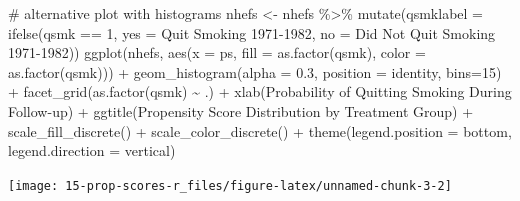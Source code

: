 \documentclass[
  10pt,
  a4paper,
]{book}
\newenvironment{Shaded}{\begin{snugshade}}{\end{snugshade}}
\newcommand{\AttributeTok}[1]{\textcolor[rgb]{0.40,0.45,0.13}{#1}}
\newcommand{\CommentTok}[1]{\textcolor[rgb]{0.37,0.37,0.37}{#1}}
\newcommand{\DecValTok}[1]{\textcolor[rgb]{0.68,0.00,0.00}{#1}}
\newcommand{\FloatTok}[1]{\textcolor[rgb]{0.68,0.00,0.00}{#1}}
\newcommand{\FunctionTok}[1]{\textcolor[rgb]{0.28,0.35,0.67}{#1}}
\newcommand{\NormalTok}[1]{\textcolor[rgb]{0.00,0.46,0.62}{#1}}
\newcommand{\OtherTok}[1]{\textcolor[rgb]{0.00,0.46,0.62}{#1}}
\newcommand{\SpecialCharTok}[1]{\textcolor[rgb]{0.37,0.37,0.37}{#1}}
\newcommand{\StringTok}[1]{\textcolor[rgb]{0.13,0.47,0.30}{#1}}
\begin{document}
\begin{Shaded}
\begin{Highlighting}[]

\CommentTok{\# alternative plot with histograms}
\NormalTok{nhefs }\OtherTok{\textless{}{-}}\NormalTok{ nhefs }\SpecialCharTok{\%\textgreater{}\%} \FunctionTok{mutate}\NormalTok{(}\AttributeTok{qsmklabel =} \FunctionTok{ifelse}\NormalTok{(qsmk }\SpecialCharTok{==} \DecValTok{1}\NormalTok{,}
                       \AttributeTok{yes =} \StringTok{\textquotesingle{}Quit Smoking 1971{-}1982\textquotesingle{}}\NormalTok{,}
                       \AttributeTok{no =} \StringTok{\textquotesingle{}Did Not Quit Smoking 1971{-}1982\textquotesingle{}}\NormalTok{))}
\FunctionTok{ggplot}\NormalTok{(nhefs, }\FunctionTok{aes}\NormalTok{(}\AttributeTok{x =}\NormalTok{ ps, }\AttributeTok{fill =} \FunctionTok{as.factor}\NormalTok{(qsmk), }\AttributeTok{color =} \FunctionTok{as.factor}\NormalTok{(qsmk))) }\SpecialCharTok{+}
  \FunctionTok{geom\_histogram}\NormalTok{(}\AttributeTok{alpha =} \FloatTok{0.3}\NormalTok{, }\AttributeTok{position =} \StringTok{\textquotesingle{}identity\textquotesingle{}}\NormalTok{, }\AttributeTok{bins=}\DecValTok{15}\NormalTok{) }\SpecialCharTok{+}
  \FunctionTok{facet\_grid}\NormalTok{(}\FunctionTok{as.factor}\NormalTok{(qsmk) }\SpecialCharTok{\textasciitilde{}}\NormalTok{ .) }\SpecialCharTok{+}
  \FunctionTok{xlab}\NormalTok{(}\StringTok{\textquotesingle{}Probability of Quitting Smoking During Follow{-}up\textquotesingle{}}\NormalTok{) }\SpecialCharTok{+}
  \FunctionTok{ggtitle}\NormalTok{(}\StringTok{\textquotesingle{}Propensity Score Distribution by Treatment Group\textquotesingle{}}\NormalTok{) }\SpecialCharTok{+}
  \FunctionTok{scale\_fill\_discrete}\NormalTok{(}\StringTok{\textquotesingle{}\textquotesingle{}}\NormalTok{) }\SpecialCharTok{+}
  \FunctionTok{scale\_color\_discrete}\NormalTok{(}\StringTok{\textquotesingle{}\textquotesingle{}}\NormalTok{) }\SpecialCharTok{+}
  \FunctionTok{theme}\NormalTok{(}\AttributeTok{legend.position =} \StringTok{\textquotesingle{}bottom\textquotesingle{}}\NormalTok{, }\AttributeTok{legend.direction =} \StringTok{\textquotesingle{}vertical\textquotesingle{}}\NormalTok{)}
\end{Highlighting}
\end{Shaded}

\begin{center}\texttt{[image: 15-prop-scores-r\_files/figure-latex/unnamed-chunk-3-2]} \end{center}
\end{document}
